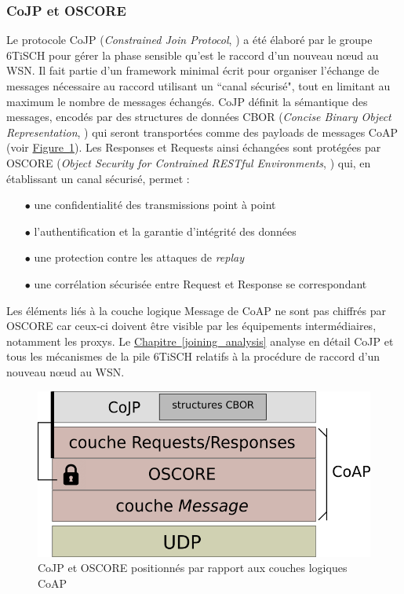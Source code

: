 \documentclass[]{report}
\newcommand{\wordlink}[2]{\hyperref[#2]{#1~\ref{#2}}}
\begin{document}
\subsubsection{CoJP et OSCORE}
\label{intro_CoJP}

\par Le protocole CoJP (\textit{Constrained Join Protocol}, \cite{ietf-6tisch-minimal-security-15}) a été élaboré par le groupe 6TiSCH pour gérer la phase sensible qu'est le raccord d'un nouveau nœud au WSN. Il fait partie d'un framework minimal \cite{ietf-6tisch-minimal-security-15} écrit pour organiser l'échange de messages nécessaire au raccord utilisant un ``canal sécurisé", tout en limitant au maximum le nombre de messages échangés. CoJP définit la sémantique des messages, encodés par des structures de données CBOR (\textit{Concise Binary Object Representation}, \cite{rfc7049}) qui seront transportées comme des payloads de messages CoAP (voir \wordlink{Figure}{fig:CoJP_stack}). Les Responses et Requests ainsi échangées sont protégées par OSCORE (\textit{Object Security for Contrained RESTful Environments}, \cite{rfc8613}) qui, en établissant un canal sécurisé, permet :
\vspace{0.1cm}
\begin{itemize}
\item[$\bullet$] une confidentialité des transmissions point à point
\item[$\bullet$] l'authentification et la garantie d'intégrité des données
\item[$\bullet$] une protection contre les attaques de \textit{replay}
\item[$\bullet$] une corrélation sécurisée entre Request et Response se correspondant
\end{itemize}

\vspace{0.2cm}

\par Les éléments liés à la couche logique Message de CoAP ne sont pas chiffrés par OSCORE car ceux-ci doivent être visible par les équipements intermédiaires, notamment les proxys. Le \wordlink{Chapitre}{joining_analysis} analyse en détail CoJP et tous les mécanismes de la pile 6TiSCH relatifs à la procédure de raccord d'un nouveau nœud au WSN.  

\vspace{0.02cm}

	\begin{figure}[!hb]
	\centering
	\includegraphics[width=0.45\linewidth]{CoJP_stack}
	\caption{CoJP et OSCORE positionnés par rapport aux couches logiques CoAP}
	\label{fig:CoJP_stack}
	\end{figure}
\end{document}
